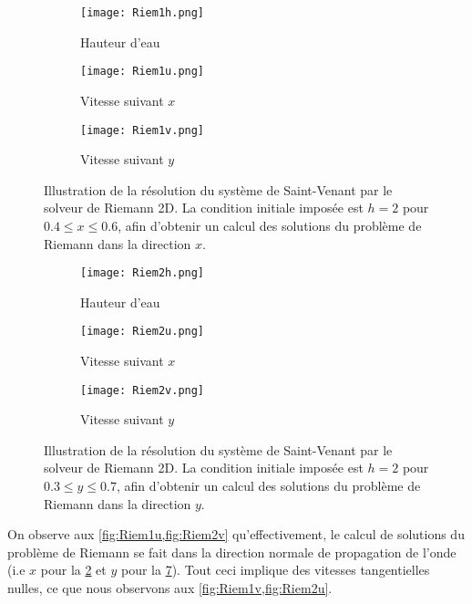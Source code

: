 \documentclass[
	french,
	11pt, %
]{fphw}
\begin{document}
\begin{figure}[H]
	\centering
	\begin{subfigure}{0.32\textwidth}
		\centering
		\texttt{[image: Riem1h.png]}
		\caption{Hauteur d'eau}
		\label{fig:Riem1h}
	\end{subfigure}
	\begin{subfigure}{0.32\textwidth}
		\centering
		\texttt{[image: Riem1u.png]}
		\caption{Vitesse suivant $x$}
		\label{fig:Riem1u}
	\end{subfigure}
	\begin{subfigure}{0.32\textwidth}
		\centering
		\texttt{[image: Riem1v.png]}
		\caption{Vitesse suivant $y$}
		\label{fig:Riem1v}
	\end{subfigure}
	\caption{Illustration de la résolution du système de Saint-Venant par le solveur de Riemann 2D. La condition initiale imposée est  $ h = 2$ pour $ 0.4 \leq x \leq 0.6$, afin d'obtenir un calcul des solutions du problème de Riemann dans la direction $x$.}
	\label{fig:Riem1}
\end{figure}

\begin{figure}[H]
	\centering
	\begin{subfigure}{0.32\textwidth}
		\centering
		\texttt{[image: Riem2h.png]}
		\caption{Hauteur d'eau}
		\label{fig:Riem2h}
	\end{subfigure}
	\begin{subfigure}{0.32\textwidth}
		\centering
		\texttt{[image: Riem2u.png]}
		\caption{Vitesse suivant $x$}
		\label{fig:Riem2u}
	\end{subfigure}
	\begin{subfigure}{0.32\textwidth}
		\centering
		\texttt{[image: Riem2v.png]}
		\caption{Vitesse suivant $y$}
		\label{fig:Riem2v}
	\end{subfigure}
	\caption{Illustration de la résolution du système de Saint-Venant par le solveur de Riemann 2D. La condition initiale imposée est $ h = 2$ pour $ 0.3 \leq y \leq 0.7$, afin d'obtenir un calcul des solutions du problème de Riemann dans la direction $y$.}
	\label{fig:Riem2}
\end{figure}

\noindent On observe aux \cref{fig:Riem1u,fig:Riem2v} qu'effectivement, le calcul de solutions du problème de Riemann se fait dans la direction normale de propagation de l'onde (i.e $x$ pour la \cref{fig:Riem1u} et $y$ pour la \cref{fig:Riem2v}). Tout ceci implique des vitesses tangentielles nulles, ce que nous observons aux \cref{fig:Riem1v,fig:Riem2u}.
\end{document}
